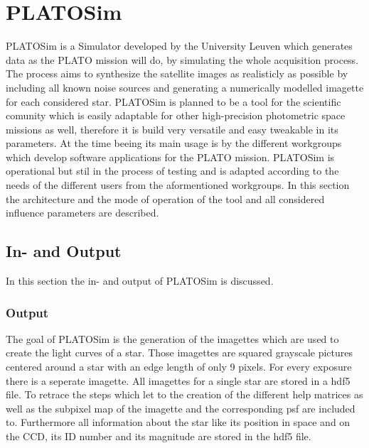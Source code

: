 \section{PLATOSim}
PLATOSim is a Simulator developed by the University Leuven which generates data as the PLATO mission will do, by simulating the whole acquisition process. The process aims to synthesize the satellite images as realisticly as possible by including all known noise sources and generating a numerically modelled imagette for each considered star. 
\newline
PLATOSim is planned to be a tool for the scientific comunity which is easily adaptable for other high-precision photometric space missions as well, therefore it is build very versatile and easy tweakable in its parameters. At the time beeing its main usage is by the different workgroups which develop software applications for the PLATO mission. PLATOSim is operational but stil in the process of testing and is adapted according to the needs of the different users from the aformentioned workgroups.
\newline
In this section the architecture and the mode of operation of the tool and all considered influence parameters are described.
\subsection{In- and Output}
In this section the in- and output of PLATOSim is discussed. 
\subsubsection{Output}
The goal of PLATOSim is the generation of the imagettes which are used to create the light curves of a star. Those imagettes are squared grayscale pictures centered around a star with an edge length of only 9 pixels. For every exposure there is a seperate imagette. All imagettes for a single star are stored in a hdf5 file. To retrace the steps which let to the creation of the different help matrices as well as the subpixel map of the imagette and the corresponding psf are included to. Furthermore all information about the star like its position in space and on the CCD, its ID number and its magnitude are stored in the hdf5 file.
